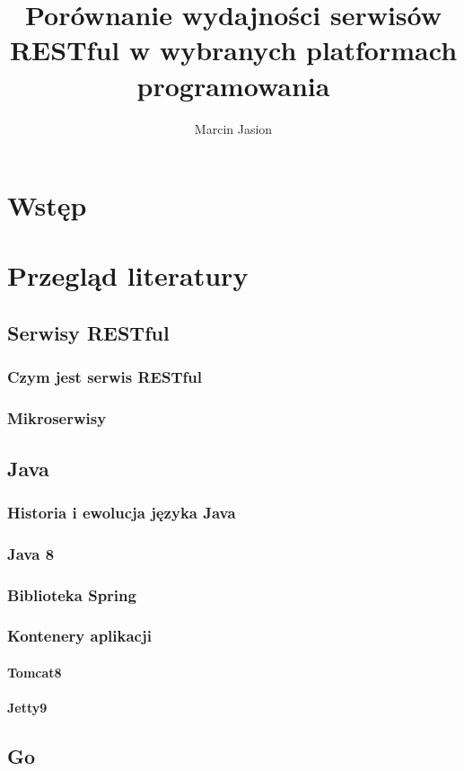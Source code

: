 \documentclass[a4paper,12pt,twoside,openany]{report}
\title{Porównanie wydajności serwisów RESTful w wybranych platformach programowania}
\author{Marcin Jasion}
\begin{document}
\maketitle

\chapter{Wstęp}

\chapter{Przegląd literatury}
\section{Serwisy RESTful}
\subsection{Czym jest serwis RESTful}
\subsection{Mikroserwisy}

\section{Java}
\subsection{Historia i ewolucja języka Java}
\subsection{Java 8}
\subsection{Biblioteka Spring}
\subsection{Kontenery aplikacji}
\subsubsection{Tomcat8}
\subsubsection{Jetty9}

\section{Go}
\end{document}
